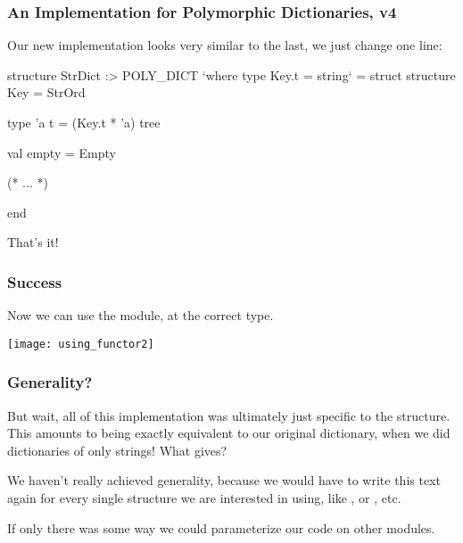 \documentclass[aspectratio=169]{beamer}
\begin{document}
\begin{frame}[fragile]
  \frametitle{An Implementation for Polymorphic Dictionaries, v4}

  Our new implementation looks very similar to the last, we just change one line:

  \pause
  \vspace{\fill}

  \begin{codeblock}
    structure StrDict :> POLY_DICT `where type Key.t = string` =
      struct
        structure Key = StrOrd

        type 'a t = (Key.t * 'a) tree

        val empty = Empty

        (* ... *)

      end
  \end{codeblock}

  \pause
  \vspace{\fill}

  That's it!
\end{frame}

\begin{frame}[fragile]
  \frametitle{Success}

  Now we can use the  module, at the correct type.

  \pause
  \vspace{\fill}

  \begin{mdframed}[leftmargin=1cm, roundcorner=10pt, backgroundcolor=black!86!white, rightmargin=1cm]
  \begin{center}
  \texttt{[image: using\_functor2]}
  \end{center}
  \end{mdframed}
\end{frame}

\begin{frame}[fragile]
  \frametitle{Generality?}

  But wait, all of this implementation was ultimately just specific to the
   structure. This amounts to being exactly equivalent to our
  original dictionary, when we did dictionaries of only strings! What gives?

  \pause
  \vspace{\fill}

  We haven't really achieved generality, because we would have to write this
  text again for every single  structure we are interested in using,
  like , or , etc.

  \pause
  \vspace{\fill}

  If only there was some way we could parameterize our code on other modules.
\end{frame}
\end{document}
